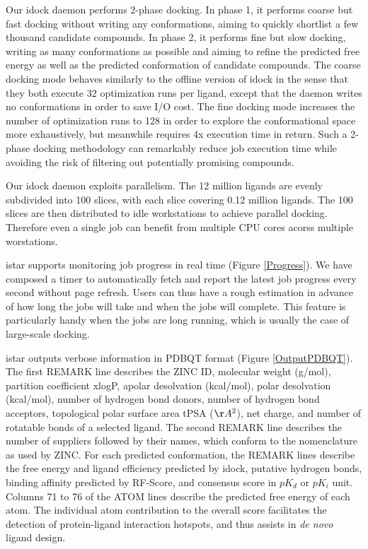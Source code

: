 \documentclass[10pt]{article}
\begin{document}
Our idock daemon performs 2-phase docking. In phase 1, it performs coarse but fast docking without writing any conformations, aiming to quickly shortlist a few thousand candidate compounds. In phase 2, it performs fine but slow docking, writing as many conformations as possible and aiming to refine the predicted free energy as well as the predicted conformation of candidate compounds. The coarse docking mode behaves similarly to the offline version of idock in the sense that they both execute 32 optimization runs per ligand, except that the daemon writes no conformations in order to save I/O cost. The fine docking mode increases the number of optimization runs to 128 in order to explore the conformational space more exhaustively, but meanwhile requires 4x execution time in return. Such a 2-phase docking methodology can remarkably reduce job execution time while avoiding the risk of filtering out potentially promising compounds.

Our idock daemon exploits parallelism. The 12 million ligands are evenly subdivided into 100 slices, with each slice covering 0.12 million ligands. The 100 slices are then distributed to idle workstations to achieve parallel docking. Therefore even a single job can benefit from multiple CPU cores acorss multiple worstations.

istar supports monitoring job progress in real time (Figure \ref{Progress}). We have composed a timer to automatically fetch and report the latest job progress every second without page refresh. Users can thus have a rough estimation in advance of how long the jobs will take and when the jobs will complete. This feature is particularly handy when the jobs are long running, which is usually the case of large-scale docking.

istar outputs verbose information in PDBQT format (Figure \ref{OutputPDBQT}). The first REMARK line describes the ZINC ID, molecular weight (g/mol), partition coefficient xlogP, apolar desolvation (kcal/mol), polar desolvation (kcal/mol), number of hydrogen bond donors, number of hydrogen bond acceptors, topological polar surface area tPSA ($\AA^2$), net charge, and number of rotatable bonds of a selected ligand. The second REMARK line describes the number of suppliers followed by their names, which conform to the nomenclature as used by ZINC. For each predicted conformation, the REMARK lines describe the free energy and ligand efficiency predicted by idock, putative hydrogen bonds, binding affinity predicted by RF-Score, and consensus score in $pK_d$ or $pK_i$ unit. Columns 71 to 76 of the ATOM lines describe the predicted free energy of each atom. The individual atom contribution to the overall score facilitates the detection of protein-ligand interaction hotspots, and thus assists in \textit{de novo} ligand design.
\end{document}
